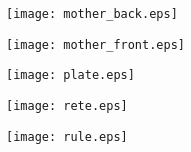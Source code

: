 \documentclass[a4paper,onecolumn,10pt]{article}
\begin{document}
\centerline{\texttt{[image: mother\_back.eps]}}
\centerline{\texttt{[image: mother\_front.eps]}}
\centerline{\texttt{[image: plate.eps]}}
\centerline{\texttt{[image: rete.eps]}}
\centerline{\texttt{[image: rule.eps]}}
\end{document}
